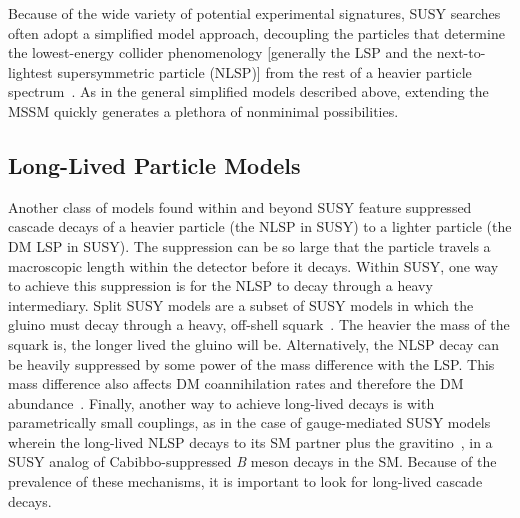 \documentclass{ar-1col}
\begin{document}
Because of the wide variety of potential experimental signatures,
SUSY searches often adopt a simplified model approach,
decoupling the particles that determine the lowest-energy collider
phenomenology [generally the LSP and the next-to-lightest supersymmetric particle (NLSP)] from the rest of a heavier
particle spectrum~\cite{Alves:2011wf}. As in the general
simplified models described above, extending the MSSM quickly
generates a plethora of nonminimal possibilities.

\subsection{Long-Lived Particle Models}\label{sec:LLPModels}

Another class of models found within and beyond SUSY feature suppressed cascade decays of a heavier particle (the NLSP
in SUSY) to a lighter particle (the DM LSP in SUSY). The
suppression can be so large that the particle travels a
macroscopic length within the detector before it decays. Within
SUSY, one way to achieve this suppression is for the NLSP to decay
through a heavy intermediary. Split SUSY models are a
subset of SUSY models in which the gluino must decay through a heavy,
off-shell squark~\cite{Masiero:2004ft}. The heavier the mass of
the squark is, the longer lived the gluino will be. Alternatively, the NLSP
decay can be heavily suppressed by some power of the mass
difference with the LSP. This mass difference also affects DM
coannihilation rates and therefore the DM
abundance~\cite{Ellis:1999mm}. Finally, another way to achieve
long-lived decays is with parametrically small couplings, as in
the case of gauge-mediated SUSY models wherein the
long-lived NLSP decays to its SM partner plus the
gravitino~\cite{Dimopoulos:1996vz}, in a SUSY analog of Cabibbo-suppressed \textit{B} meson decays in the SM. Because of the prevalence of
these mechanisms, it is important to look for long-lived cascade
decays.
\end{document}
